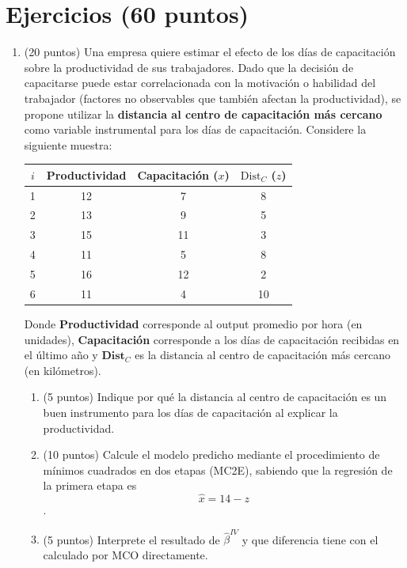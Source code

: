\documentclass[10pt,a4paper]{article}
\begin{document}
\section{Ejercicios (60 puntos)}

\begin{enumerate}
    

\item (20 puntos) Una empresa quiere estimar el efecto de los días de capacitación sobre la productividad de sus trabajadores. Dado que la decisión de capacitarse puede estar correlacionada con la motivación o habilidad del trabajador (factores no observables que también afectan la productividad), se propone utilizar la \textbf{distancia al centro de capacitación más cercano} como variable instrumental para los días de capacitación. Considere la siguiente muestra:

\begin{center}
\begin{tabular}{|c|c|c|c|}
\hline
$i$ & Productividad & Capacitación ($x$)& $\text{Dist}_C$ ($z$) \\
\hline
1 & 12 & 7 & 8 \\
2 & 13 & 9 & 5 \\
3 & 15 & 11 & 3 \\
4 & 11 & 5 & 8 \\
5 & 16 & 12 & 2 \\
6 & 11 & 4 & 10 \\
\hline
\end{tabular}
\end{center}

\noindent Donde \textbf{Productividad} corresponde al output promedio por hora (en unidades), \textbf{Capacitación} corresponde a los días de capacitación recibidas en el último año y $\mathbf{Dist}_C$ es la distancia al centro de capacitación más cercano (en kilómetros).

\begin{enumerate}
    \item (5 puntos) Indique por qué la distancia al centro de capacitación es un buen instrumento para los días de capacitación al explicar la productividad.
    \item (10 puntos) Calcule el modelo predicho  mediante el procedimiento de {mínimos cuadrados en dos etapas (MC2E)}, sabiendo que la regresión de la primera etapa es $$\hat{x} = 14 - z$$.
    \item (5 puntos) Interprete el resultado de $\hat\beta^{IV}$ y que diferencia tiene con el calculado por MCO directamente.
\end{enumerate}


\end{enumerate}
\end{document}
